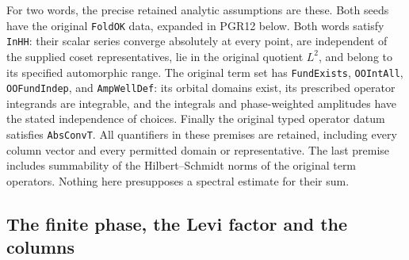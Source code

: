 For two words, the precise retained analytic assumptions are these.
Both seeds have the original \texttt{FoldOK} data, expanded in
PGR12 below.  Both words satisfy \texttt{InHH}: their scalar series
converge absolutely at every point, are independent of the supplied
coset representatives, lie in the original quotient \(L^2\), and
belong to its specified automorphic range.  The original term set has
\texttt{FundExists}, \texttt{OOIntAll}, \texttt{OOFundIndep}, and
\texttt{AmpWellDef}: its orbital domains exist, its prescribed
operator integrands are integrable, and the integrals and
phase-weighted amplitudes have the stated independence of choices.
Finally the original typed operator datum satisfies \texttt{AbsConvT}.
All quantifiers in these premises are retained, including every column
vector and every permitted domain or representative.  The last premise
includes summability of the Hilbert--Schmidt norms of the original term
operators.  Nothing here presupposes a spectral estimate for their sum.

\subsection{The finite phase, the Levi factor and the columns}

